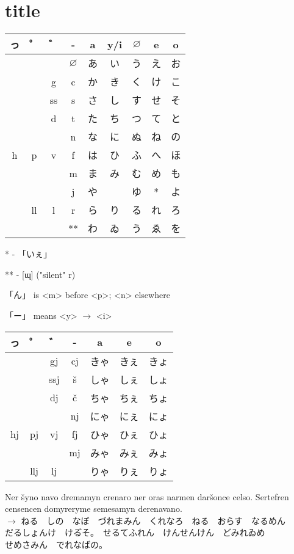 \documentclass{book}
\begin{document}
\section{title}

\newcommand{\rowof}[9]{#1 & #2 & #3 & #4 & \textsf{#5} & \textsf{#6} & \textsf{#7} & \textsf{#8} & \textsf{#9} \\ \hline}
\newcommand{\rowofa}[7]{#1 & #2 & #3 & #4 & \textsf{#5} & \textsf{#6} & \textsf{#7} \\ \hline}

\begin{tabular}{|c|c|c|c||c|c|c|c|c|}
    \hline
    \textbf{\textsf{っ}}  & \textbf{\textsf{゜}} & \textbf{\textsf{゛}} & - & \textbf{a} & \textbf{y/i} & $\mathbf{\varnothing}$ & \textbf{e} & \textbf{o} \\ \hline \hline
    \rowof{}{}{}{$\varnothing$}{あ}{い}{う}{え}{お}
    \rowof{}{}{g}{c}{か}{き}{く}{け}{こ}
    \rowof{}{}{ss}{s}{さ}{し}{す}{せ}{そ}
    \rowof{}{}{d}{t}{た}{ち}{つ}{て}{と}
    \rowof{}{}{}{n}{な}{に}{ぬ}{ね}{の}
    \rowof{h}{p}{v}{f}{は}{ひ}{ふ}{へ}{ほ}
    \rowof{}{}{}{m}{ま}{み}{む}{め}{も}
    \rowof{}{}{}{j}{や}{}{ゆ}{*}{よ}
    \rowof{}{ll}{l}{r}{ら}{り}{る}{れ}{ろ}
    \rowof{}{}{}{**}{わ}{ゐ}{う}{ゑ}{を}
\end{tabular}

* - \textsf{「いぇ」 }

** - [ɰ] ("silent" r)

\textsf{「ん」} is <m> before <p>; <n> elsewhere

\textsf{「ー」} means <y> $\rightarrow$ <i>

\begin{tabular}{|c|c|c|c||c|c|c|}
    \hline
    \textbf{\textsf{っ}}  & \textbf{\textsf{゜}} & \textbf{\textsf{゛}} & - & \textbf{a} & \textbf{e} & \textbf{o} \\ \hline \hline
    \rowofa{}{}{gj}{cj}{きゃ}{きぇ}{きょ}
    \rowofa{}{}{ssj}{š}{しゃ}{しぇ}{しょ}
    \rowofa{}{}{dj}{č}{ちゃ}{ちぇ}{ちょ}
    \rowofa{}{}{}{nj}{にゃ}{にぇ}{にょ}
    \rowofa{hj}{pj}{vj}{fj}{ひゃ}{ひぇ}{ひょ}
    \rowofa{}{}{}{mj}{みゃ}{みぇ}{みょ}
    \rowofa{}{llj}{lj}{}{りゃ}{りぇ}{りょ}
\end{tabular}

Ner šyno navo dremamyn crenaro ner oras narmen daršonce celso. Sertefren censencen domyreryme semesamyn derenavano. \\
$\rightarrow$ \textsf{
    ねる　しの　なぼ　づれまみん　くれなろ　ねる　おらす　なるめん \\
    だるしょんけ　ける゙そ。　せるてふれん　けんせんけん　どみれゐめ \\
    せめさみん　でれなばの。
}
\end{document}
